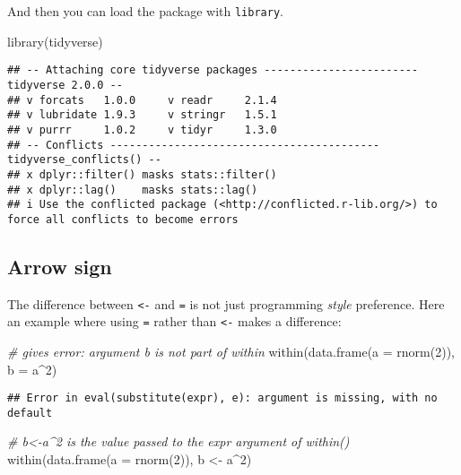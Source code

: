 \documentclass[
  oneside]{book}
\newenvironment{Shaded}{\begin{snugshade}}{\end{snugshade}}
\newcommand{\AttributeTok}[1]{\textcolor[rgb]{0.77,0.63,0.00}{#1}}
\newcommand{\CommentTok}[1]{\textcolor[rgb]{0.56,0.35,0.01}{\textit{#1}}}
\newcommand{\DecValTok}[1]{\textcolor[rgb]{0.00,0.00,0.81}{#1}}
\newcommand{\FunctionTok}[1]{\textcolor[rgb]{0.00,0.00,0.00}{#1}}
\newcommand{\NormalTok}[1]{#1}
\newcommand{\OtherTok}[1]{\textcolor[rgb]{0.56,0.35,0.01}{#1}}
\newcommand{\SpecialCharTok}[1]{\textcolor[rgb]{0.00,0.00,0.00}{#1}}
\begin{document}
And then you can load the package with \texttt{library}.

\begin{Shaded}
\begin{Highlighting}[]
\FunctionTok{library}\NormalTok{(tidyverse)}
\end{Highlighting}
\end{Shaded}

\begin{verbatim}
## -- Attaching core tidyverse packages ------------------------ tidyverse 2.0.0 --
## v forcats   1.0.0     v readr     2.1.4
## v lubridate 1.9.3     v stringr   1.5.1
## v purrr     1.0.2     v tidyr     1.3.0
## -- Conflicts ------------------------------------------ tidyverse_conflicts() --
## x dplyr::filter() masks stats::filter()
## x dplyr::lag()    masks stats::lag()
## i Use the conflicted package (<http://conflicted.r-lib.org/>) to force all conflicts to become errors
\end{verbatim}

\hypertarget{arrow-sign}{%
\subsection{Arrow sign}\label{arrow-sign}}

The difference between \texttt{\textless{}-} and \texttt{=} is not just programming \emph{style} preference.
Here an example where using \texttt{=} rather than \texttt{\textless{}-} makes a difference:

\begin{Shaded}
\begin{Highlighting}[]
\CommentTok{\# gives error: argument \textquotesingle{}b\textquotesingle{} is not part of \textquotesingle{}within\textquotesingle{}}
\FunctionTok{within}\NormalTok{(}\FunctionTok{data.frame}\NormalTok{(}\AttributeTok{a =} \FunctionTok{rnorm}\NormalTok{(}\DecValTok{2}\NormalTok{)), }\AttributeTok{b =}\NormalTok{ a}\SpecialCharTok{\^{}}\DecValTok{2}\NormalTok{)}
\end{Highlighting}
\end{Shaded}

\begin{verbatim}
## Error in eval(substitute(expr), e): argument is missing, with no default
\end{verbatim}

\begin{Shaded}
\begin{Highlighting}[]
\CommentTok{\# \textquotesingle{}b\textless{}{-}a\^{}2\textquotesingle{} is the value passed to the expr argument of within()}
\FunctionTok{within}\NormalTok{(}\FunctionTok{data.frame}\NormalTok{(}\AttributeTok{a =} \FunctionTok{rnorm}\NormalTok{(}\DecValTok{2}\NormalTok{)), b }\OtherTok{\textless{}{-}}\NormalTok{ a}\SpecialCharTok{\^{}}\DecValTok{2}\NormalTok{)}
\end{Highlighting}
\end{Shaded}
\end{document}
